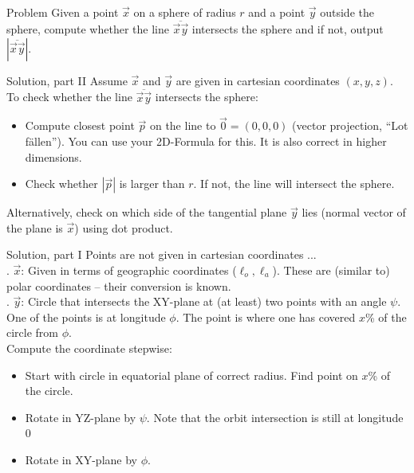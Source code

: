 \begin{slide}
    \begin{block}{Problem}
			Given a point $\vec x$ on a sphere of radius $r$ and a point $\vec y$ outside the sphere, compute whether the line $\overline{\vec x \vec y}$ intersects the sphere and if not, output $|\overline{\vec x \vec y}|$.
    \end{block}
	\pause
	\begin{block}{Solution, part II}
		Assume $\vec x$ and $\vec y$ are given in cartesian coordinates $(x,y,z)$.\\
		To check whether the line $\overline{\vec x \vec y}$ intersects the sphere:
		\begin{itemize}
			\item Compute closest point $\vec p$ on the line to $\vec 0 = (0,0,0)$ (vector projection, ``Lot fällen'').
				You can use your 2D-Formula for this. It is also correct in higher dimensions.
			\item Check whether $|\vec p|$ is larger than $r$. If not, the line will intersect the sphere.
		\end{itemize}
		Alternatively, check on which side of the tangential plane $\vec y$ lies (normal vector of the plane is $\vec x$) using dot product.
	\end{block}
\end{slide}

\begin{slide}
	\begin{block}{Solution, part I}
		Points are not given in cartesian coordinates ...\\ . $\vec x$: Given in terms of geographic coordinates ($\ell_o, \ell_a$).
These are (similar to) polar coordinates -- their conversion is known.\\ . $\vec y$: Circle that intersects the XY-plane at (at least) two points with an angle $\psi$. One of the points is at longitude $\phi$. The point is where one has covered $x$\% of the circle from $\phi$.\\ \pause
		Compute the coordinate stepwise:
		\begin{itemize}
			\item<5-> Start with circle in equatorial plane of correct radius. Find point on $x$\% of the circle.
			\item<6-> Rotate in YZ-plane by $\psi$. Note that the orbit intersection is still at longitude 0
			\item<7-> Rotate in XY-plane by $\phi$.
		\end{itemize}
	\end{block}
\end{slide}

